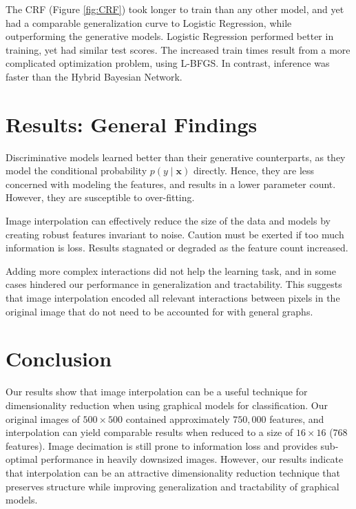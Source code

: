 \documentclass{article}
\begin{document}
The CRF (Figure \ref{fig:CRF}) took longer to train than
any other model, and yet
had a comparable generalization curve to Logistic Regression, while outperforming
the generative models. Logistic Regression performed better in training, yet
had similar test scores. The increased train times result from
a more complicated optimization problem, using L-BFGS. In contrast,
inference was faster than the Hybrid Bayesian Network.

\section{Results: General Findings}
Discriminative models learned better than their generative counterparts, as they
model the conditional probability $p(y\mid \mathbf{x})$ directly. Hence, they are
less concerned with modeling the features, and results in a lower parameter count.
However, they are susceptible to over-fitting.

Image interpolation can effectively reduce the size of the data and models
by creating robust features invariant to noise. Caution must be exerted if too
much information is loss. Results
stagnated or degraded as the feature count increased.

Adding more complex interactions did not help the learning task, and in some cases
hindered our performance in generalization and tractability. This suggests that image
interpolation encoded all relevant interactions between pixels in the original
image that do not need to be accounted for with general graphs.



\section{Conclusion}
\label{sec:conclusion}
Our results show that image interpolation can be a useful technique
for dimensionality reduction when using graphical models for classification.
Our original images of $500 \times 500$ contained approximately $750,000$ features,
and interpolation can yield comparable results when reduced to a size of
$16 \times 16$ ($768$ features). Image decimation is still prone to information
loss and provides sub-optimal performance in heavily downsized images. However,
our results indicate that interpolation can be an attractive dimensionality
reduction technique that preserves structure while improving generalization and
tractability of graphical models.
\end{document}
